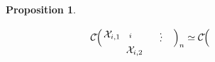 \documentclass[10pt]{amsart}
\theoremstyle{break}
\newtheorem{pro}[de]{Proposition}
\begin{document}
\begin{pro}
\begin{eqnarray*}
{{\mathcal{C}}}\acute{}\Big( \ 
\unitlength 0.1in
\begin{picture}(9.0,2.500)(1.0,-4.500)
\special{pn 8}\special{pa 700 500}\special{pa 740 550}\special{fp}\special{pa 790 440}\special{pa 870 520}\special{fp}\special{pa 790 350}\special{pa 870 310}\special{fp}\special{pa 700 300}\special{pa 730 250}\special{fp}\put(8.7000,-3.6000){\makebox(0,0){$\cdot$}}\put(8.8000,-4.1000){\makebox(0,0){$\cdot$}}\put(8.700,-4.6000){\makebox(0,0){$\cdot$}}\special{pn 8}\special{ar 700 400 100 100  0.0000000 0.1200000}\special{ar 700 400 100 100  0.4800000 0.6000000}\special{ar 700 400 100 100  0.9600000 1.0800000}\special{ar 700 400 100 100  1.4400000 1.5600000}\special{ar 700 400 100 100  1.9200000 2.0400000}\special{ar 700 400 100 100  2.4000000 2.5200000}\special{ar 700 400 100 100  2.8800000 3.0000000}\special{ar 700 400 100 100  3.3600000 3.4800000}\special{ar 700 400 100 100  3.8400000 3.9600000}\special{ar 700 400 100 100  4.3200000 4.4400000}\special{ar 700 400 100 100  4.8000000 4.9200000}\special{ar 700 400 100 100  5.2800000 5.4000000}\special{ar 700 400 100 100  5.7600000 5.8800000}\special{ar 700 400 100 100  6.2400000 6.2832853}\put(1.90000,-3.8000){\makebox(0,0){$\mathcal{X}_{{i,1}}$}}\put(5.04000,-6.000){\makebox(0,0){$\mathcal{X}_{{i,2}}$}}\put(4.5000,-3.8000){\makebox(0,0){${}_{i}$}}\special{pn 8}\special{pa 504 511}\special{pa 504 451}\special{fp}\special{pn 8}\special{pa 600 390}\special{pa 575 424}\special{pa 551 453}\special{pa 527 474}\special{pa 504 481}\special{pa 483 470}\special{pa 462 447}\special{pa 440 418}\special{pa 416 392}\special{pa 389 375}\special{pa 359 371}\special{pa 325 375}\special{pa 300 380}\special{sp}\special{pn 8}\special{pa 590 410}\special{pa 600 400}\special{fp}\special{sh 1}\special{pa 600 400}\special{pa 539 433}\special{pa 562 438}\special{pa 567 461}\special{pa 600 400}\special{fp}\end{picture} \ \Big)_{n} \simeq {{\mathcal{C}}}\acute{}\Big( \ 
\unitlength 0.1in
\begin{picture}(9.0,1.7500)(1.0,-4.500)

\end{picture}
\end{eqnarray*}
\end{pro}
\end{document}
